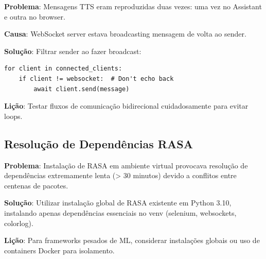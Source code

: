 \documentclass{report}
\begin{document}
\textbf{Problema}: Mensagens TTS eram reproduzidas duas vezes: uma vez no Assistant e outra no browser.

\textbf{Causa}: WebSocket server estava broadcasting mensagem de volta ao sender.

\textbf{Solução}: Filtrar sender ao fazer broadcast:
\begin{verbatim}
for client in connected_clients:
    if client != websocket:  # Don't echo back
        await client.send(message)
\end{verbatim}

\textbf{Lição}: Testar fluxos de comunicação bidirecional cuidadosamente para evitar loops.

\subsection{Resolução de Dependências RASA}

\textbf{Problema}: Instalação de RASA em ambiente virtual provocava resolução de dependências extremamente lenta (> 30 minutos) devido a conflitos entre centenas de pacotes.

\textbf{Solução}: Utilizar instalação global de RASA existente em Python 3.10, instalando apenas dependências essenciais no venv (selenium, websockets, colorlog).

\textbf{Lição}: Para frameworks pesados de ML, considerar instalações globais ou uso de containers Docker para isolamento.
\end{document}
